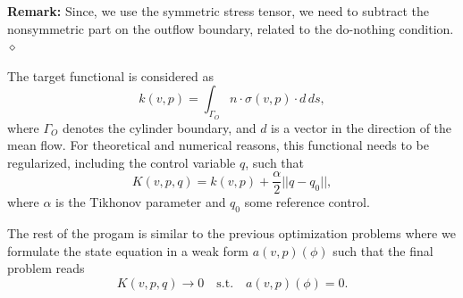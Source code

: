 \textbf{Remark:} Since, we use the 
symmetric stress tensor, we need to subtract the nonsymmetric part 
on the outflow boundary, related to the do-nothing condition.
$\diamond$

The target functional is considered as 
\[
k(v,p) = \int_{\Gamma_O} n\cdot \sigma(v,p)\cdot d \, ds,
\]
where $\Gamma_O$ denotes the cylinder boundary, and $d$ is a vector in the
direction
of the mean flow. For theoretical and numerical reasons, this functional 
needs to be regularized, including the control variable $q$, such that
\[
K(v,p,q) = k(v,p) + \frac{\alpha}{2}||q - q_0||,
\] 
where $\alpha$ is the Tikhonov parameter and $q_0$ some 
reference control. 

The rest of the progam is similar to the previous optimization problems where
we formulate the state equation in a weak form $a(v,p)(\phi)$ such that the 
final problem reads
\[
K(v,p,q) \rightarrow 0 \quad \text{s.t.} \quad a(v,p)(\phi) = 0.
\]


